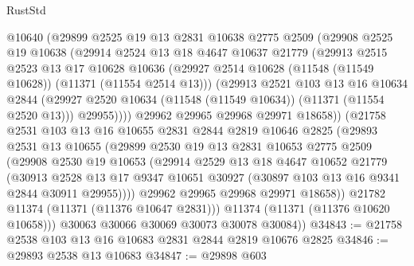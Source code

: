 \begin{lexlean}{RustStd}
\begin{coremodule}
            @10640
            (@29899
              @2525
              @19
              @13
              @2831
              @10638
              @2775
              @2509
              (@29908
                @2525
                @19
                @10638
                (@29914
                  @2524
                  @13
                  @18
                  @4647
                  @10637
                  @21779
                  (@29913
                    @2515
                    @2523
                    @13
                    @17
                    @10628
                    @10636
                    (@29927 @2514 @10628 (@11548 (@11549 @10628)) (@11371 (@11554 @2514 @13)))
                    (@29913
                      @2521
                      @103
                      @13
                      @16
                      @10634
                      @2844
                      (@29927 @2520 @10634 (@11548 (@11549 @10634)) (@11371 (@11554 @2520 @13)))
                      @29955))))
              @29962
              @29965
              @29968
              @29971
              @18658))
          (@21758
            @2531
            @103
            @13
            @16
            @10655
            @2831
            @2844
            @2819
            @10646
            @2825
            (@29893
              @2531
              @13
              @10655
              (@29899
                @2530
                @19
                @13
                @2831
                @10653
                @2775
                @2509
                (@29908
                  @2530
                  @19
                  @10653
                  (@29914
                    @2529
                    @13
                    @18
                    @4647
                    @10652
                    @21779
                    (@30913
                      @2528
                      @13
                      @17
                      @9347
                      @10651
                      @30927
                      (@30897 @103 @13 @16 @9341 @2844 @30911 @29955))))
                @29962
                @29965
                @29968
                @29971
                @18658))
            @21782
            @11374
            (@11371 (@11376 @10647 @2831)))
          @11374
          (@11371 (@11376 @10620 @10658)))
        @30063
        @30066
        @30069
        @30073
        @30078
        @30084))
@34843 := @21758 @2538 @103 @13 @16 @10683 @2831 @2844 @2819 @10676 @2825
@34846 := @29893 @2538 @13 @10683
@34847 := @29898 @603

\end{coremodule}
\end{lexlean}
